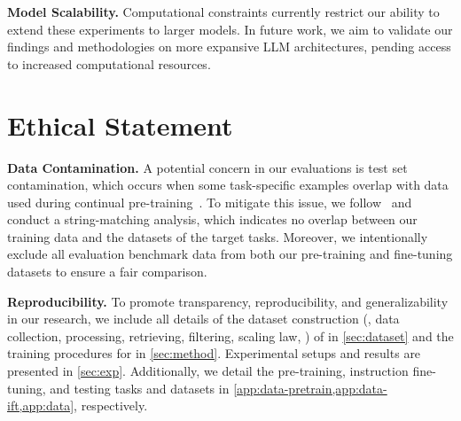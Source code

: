 \noindent \textbf{Model Scalability.} Computational constraints currently restrict our ability to extend these experiments to larger models. In future work, we aim to validate our findings and methodologies on more expansive LLM architectures, pending access to increased computational resources.


\section*{Ethical Statement}
\noindent \textbf{Data Contamination.} 
A potential concern in our evaluations is test set contamination, which occurs when some task-specific examples overlap with data used during continual pre-training~\cite{oren2024proving}. To mitigate this issue, we follow~\citet{wang-etal-2024-improving-text} and conduct a string-matching analysis, which indicates no overlap between our training data and the datasets of the target tasks. Moreover, we intentionally exclude all evaluation benchmark data from both our pre-training and fine-tuning datasets to ensure a fair comparison.

\noindent \textbf{Reproducibility.}
To promote transparency, reproducibility, and generalizability in our research, we include all details of the dataset construction (\eg, data collection, processing, retrieving, filtering, scaling law, \etc) of \dataset in \cref{sec:dataset} and the training procedures for \method in \cref{sec:method}. 
Experimental setups and results are presented in \cref {sec:exp}.
Additionally, we detail the pre-training, instruction fine-tuning, and testing tasks and datasets in \cref{app:data-pretrain,app:data-ift,app:data}, respectively. 
